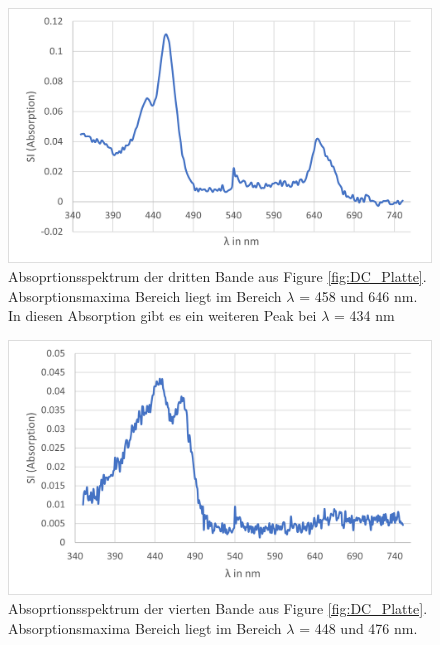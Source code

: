 \documentclass[10pt,a4paper]{article}
\begin{document}
			\begin{figure}[H]
				\centering
				\includegraphics[scale=1]{thirdband.png}
				\caption{Absoprtionsspektrum der dritten Bande aus Figure \ref{fig:DC_Platte}. Absorptionsmaxima Bereich liegt im Bereich $\lambda$ = 458 und 646 nm. In diesen Absorption gibt es ein weiteren Peak bei $\lambda$ = 434 nm}
				\label{fig:dritte Bande}
			\end{figure}
			
			\begin{figure}[H]
				\centering
				\includegraphics[scale=1]{fourthband.png}
				\caption{Absoprtionsspektrum der vierten Bande aus Figure \ref{fig:DC_Platte}. Absorptionsmaxima Bereich liegt im Bereich $\lambda$ = 448 und 476 nm.}
				\label{fig:vierte Bande}
			\end{figure}
			
\end{document}
